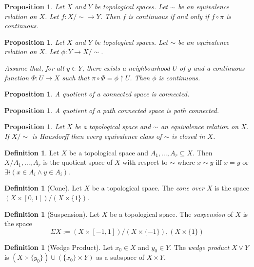 \documentclass{book}
\newtheorem{prop}[ax]{Proposition}
\theoremstyle{definition}
\newtheorem{df}[ax]{Definition}
\begin{document}
\begin{prop}
\label{prop:map_from_quotient_continuous}
Let $X$ and $Y$ be topological spaces. Let $\sim$ be an equivalence relation on $X$. Let $f : X / \sim \rightarrow Y$. Then $f$ is continuous if and only if $f \circ \pi$ is continuous.
\end{prop}

\begin{prop}
Let $X$ and $Y$ be topological spaces. Let $\sim$ be an equivalence relation on $X$. Let $\phi : Y \rightarrow X / \sim$.

Assume that, for all $y \in Y$, there exists a neighbourhood $U$ of $y$ and a continuous function $\Phi : U \rightarrow X$ such that $\pi \circ \Phi = \phi \restriction U$. Then $\phi$ is continuous.
\end{prop}

\begin{prop}
A quotient of a connected space is connected.
\end{prop}

\begin{prop}
A quotient of a path connected space is path connected.
\end{prop}

\begin{prop}
Let $X$ be a topological space and $\sim$ an equivalence relation on $X$. If $X / \sim$ is Hausdorff then every equivalence class of $\sim$ is closed in $X$.
\end{prop}

\begin{df}
Let $X$ be a topological space and $A_1, \ldots, A_r \subseteq X$. Then $X / A_1, \ldots, A_r$ is the quotient space of $X$ with respect to $\sim$ where $x \sim y$ iff $x = y$ or $\exists i (x \in A_i \wedge y \in A_i)$.
\end{df}

\begin{df}[Cone]
Let $X$ be a topological space. The \emph{cone over $X$} is the space $(X \times [0,1]) / (X \times \{1\})$.
\end{df}

\begin{df}[Suspension]
Let $X$ be a topological space. The \emph{suspension} of $X$ is the space
\[ \Sigma X := (X \times [-1,1]) / (X \times \{-1\}),(X \times \{1\}) \]
\end{df}

\begin{df}[Wedge Product]
Let $x_0 \in X$ and $y_0 \in Y$. The \emph{wedge product} $X \vee Y$ is $(X \times \{y_0\}) \cup (\{x_0\} \times Y)$ as a subspace of $X \times Y$.
\end{df}
\end{document}
